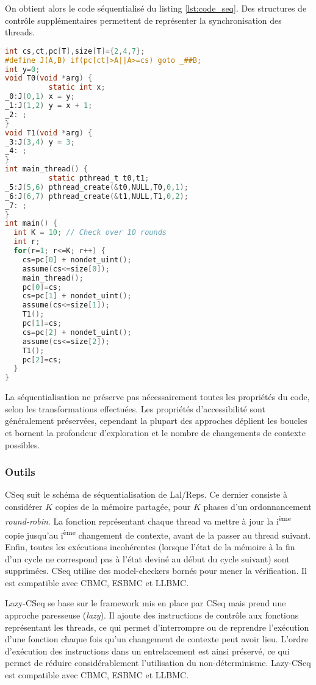 On obtient alors le code séquentialisé du listing \ref{lst:code_seq}.
Des structures de contrôle supplémentaires permettent de représenter la
synchronisation des threads.

\begin{lstlisting}[language=C, label=lst:code_seq, frame=single,
  caption=Code séquentialisé, float=*]
int cs,ct,pc[T],size[T]={2,4,7};
#define J(A,B) if(pc[ct]>A||A>=cs) goto _##B;
int y=0;
void T0(void *arg) {
          static int x;
_0:J(0,1) x = y;
_1:J(1,2) y = x + 1;
_2: ;
}
void T1(void *arg) {
_3:J(3,4) y = 3;
_4: ;
}
int main_thread() {
          static pthread_t t0,t1;
_5:J(5,6) pthread_create(&t0,NULL,T0,0,1);
_6:J(6,7) pthread_create(&t1,NULL,T1,0,2);
_7: ;
}
int main() {
  int K = 10; // Check over 10 rounds
  int r;
  for(r=1; r<=K; r++) {
    cs=pc[0] + nondet_uint();
    assume(cs<=size[0]);
    main_thread();
    pc[0]=cs;
    cs=pc[1] + nondet_uint();
    assume(cs<=size[1]);
    T1();
    pc[1]=cs;
    cs=pc[2] + nondet_uint();
    assume(cs<=size[2]);
    T1();
    pc[2]=cs;
  }
}
\end{lstlisting}

La séquentialisation ne préserve pas nécessairement toutes les
propriétés du code, selon les transformations effectuées. Les propriétés
d'accessibilité sont généralement préservées, cependant la plupart des
approches déplient les boucles et bornent la profondeur d'exploration et
le nombre de changements de contexte possibles.

\subsubsection{Outils}

CSeq\cite{CSeq} suit le schéma de séquentialisation de Lal/Reps. Ce dernier
consiste à considérer \(K\) copies de la mémoire partagée, pour \(K\) phases
d'un ordonnancement \emph{round-robin}. La fonction représentant chaque thread
va mettre à jour la i\textsuperscript{ème} copie jusqu'au i\textsuperscript{ème}
changement de contexte, avant de la passer au thread suivant. Enfin, toutes les
exécutions incohérentes (lorsque l'état de la mémoire à la fin d'un cycle ne
correspond pas à l'état deviné au début du cycle suivant) sont supprimées. CSeq
utilise des model-checkers bornés pour mener la vérification. Il est compatible
avec CBMC, ESBMC et LLBMC.

Lazy-CSeq\cite{LazyCSeq} se base sur le framework mis en place par CSeq mais
prend une approche paresseuse (\emph{lazy}). Il ajoute des instructions de
contrôle aux fonctions représentant les threads, ce qui permet d'interrompre ou
de reprendre l'exécution d'une fonction chaque fois qu'un changement de contexte
peut avoir lieu. L'ordre d'exécution des instructions dans un entrelacement est
ainsi préservé, ce qui permet de réduire considérablement l'utilisation du
non-déterminisme. Lazy-CSeq est compatible avec CBMC, ESBMC et LLBMC.

